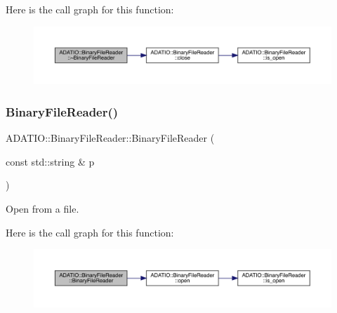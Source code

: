 Here is the call graph for this function\+:\nopagebreak
\begin{figure}[H]
\begin{center}
\leavevmode
\includegraphics[width=350pt]{df/d41/classADATIO_1_1BinaryFileReader_aa0905fcdd1723ce850a89baf9a111345_cgraph}
\end{center}
\end{figure}
\mbox{\label{classADATIO_1_1BinaryFileReader_a987273f138d0fcc4a1e9a95c51b093ef}} 
\subsubsection{\texorpdfstring{BinaryFileReader()}{BinaryFileReader()}\hspace{0.1cm}{\footnotesize\ttfamily [2/6]}}
{\footnotesize\ttfamily A\+D\+A\+T\+I\+O\+::\+Binary\+File\+Reader\+::\+Binary\+File\+Reader (\begin{DoxyParamCaption}\item[{const std\+::string \&}]{p }\end{DoxyParamCaption})\hspace{0.3cm}{\ttfamily [explicit]}}



Open from a file. 

Here is the call graph for this function\+:\nopagebreak
\begin{figure}[H]
\begin{center}
\leavevmode
\includegraphics[width=350pt]{df/d41/classADATIO_1_1BinaryFileReader_a987273f138d0fcc4a1e9a95c51b093ef_cgraph}
\end{center}
\end{figure}
\mbox{\label{classADATIO_1_1BinaryFileReader_a77475e594db53a85f7f15050a442faa1}} 
